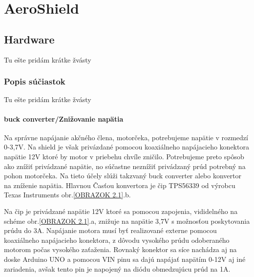 \chapter{AeroShield}

\section{Hardware}

Tu ešte pridám krátke žvásty

\subsection{Popis súčiastok}

Tu ešte pridám krátke žvásty

\subsubsection{buck converter/Znižovanie napätia}

Na správne napájanie akčného člena, motorčeka, potrebujeme napätie v rozmedzí 0-3,7V. Na shield je však privázdané pomocou koaxiálneho napájacieho konektora napätie 12V ktoré by motor v priebehu chvíle zničilo. Potrebujeme preto spôsob ako znížiť privádzané napätie, no súčastne neznížiť privádzaný prúd potrebný na pohon motorčeka. Na tieto účely slúži takzvaný buck converter alebo konvertor na zníženie napätia. Hlavnou Časťou konvertora je čip TPS56339 od výrobcu Texas Instruments obr.\ref{OBRAZOK 2.1}.b.

 Na čip je privádzané napätie 12V ktoré sa pomocou zapojenia, vididelného na schéme obr.\ref{OBRAZOK 2.1}.a, znižuje na napätie 3,7V s možnosťou poskytovania prúdu do 3A. Napájanie motora musí byť realizované externe pomocou koaxiálneho napájacieho konektora, z dôvodu vysokého prúdu odoberaného motorom počas vysokého zaťaženia. Rovnaký konektor sa síce nachádza aj na doske Arduino UNO a pomocou VIN pinu sa dajú napájať napätím 0-12V aj iné zariadenia, avšak tento pin je napojený na diódu obmedzujúcu prúd na 1A\cite{ampere}\cite{ampere2}.



